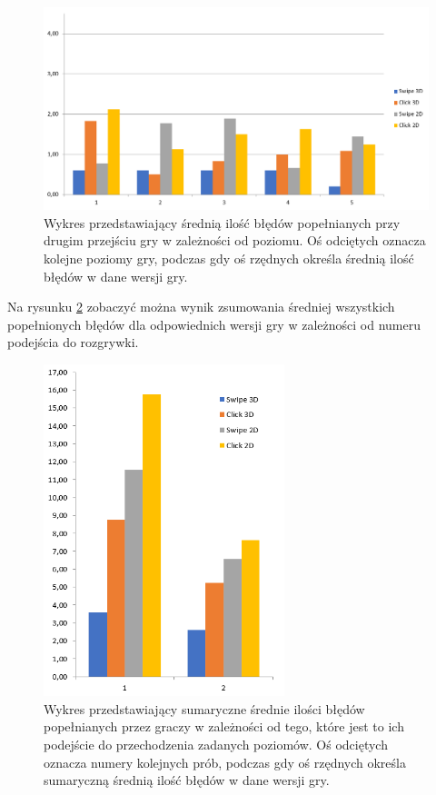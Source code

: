 \documentclass[a4paper,12pt,numbers=noenddot]{report}
\begin{document}
\begin{figure}[h!]
	\centering
  	\includegraphics[width=\linewidth]{diag/errors_2.png}
	\caption{Wykres przedstawiający średnią ilość błędów popełnianych przy drugim przejściu gry w zależności od poziomu. Oś odciętych oznacza kolejne poziomy gry, podczas gdy oś rzędnych określa średnią ilość błędów w dane wersji gry.}
	\label{fig:diag_errors_2}
\end{figure}

Na rysunku \ref{fig:diag_errors_sum} zobaczyć można wynik zsumowania średniej wszystkich popełnionych błędów dla odpowiednich wersji gry w zależności od numeru podejścia do rozgrywki.

\begin{figure}[h!]
	\centering
  	\includegraphics[width=7cm]{diag/errors_sum.png}
	\caption{Wykres przedstawiający sumaryczne średnie ilości błędów popełnianych przez graczy w zależności od tego, które jest to ich podejście do przechodzenia zadanych poziomów. Oś odciętych oznacza numery kolejnych prób, podczas gdy oś rzędnych określa sumaryczną średnią ilość błędów w dane wersji gry.}
	\label{fig:diag_errors_sum}
\end{figure}
\end{document}
